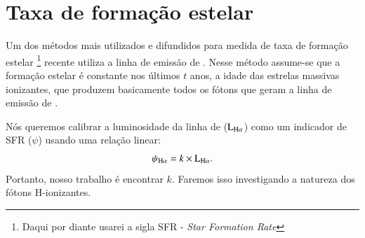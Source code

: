 \section{Taxa de formação estelar}
\label{sec:emlines:SFR}

Um dos métodos mais utilizados e difundidos para medida de taxa de formação estelar \footnote{Daqui
por diante usarei a sigla SFR - {\em Star Formation Rate}} recente utiliza a linha de emissão de
\Halpha. Nesse método assume-se que a formação estelar é constante nos últimos $t$ anos, a idade das
estrelas massivas ionizantes, que produzem basicamente todos os fótons que geram a linha de emissão
de \Halpha.

Nós queremos calibrar a luminosidade da linha de \Halpha ($\LHalpha$) como um indicador
de SFR ($\psi$) \citep[e.g., ][]{Kennicutt.1998a} usando uma relação linear:
\begin{equation}
	\psi_{\Halpha} = k \times \LHalpha.
	\label{eq:SFRHa}
\end{equation}
\noindent Portanto, nosso trabalho é encontrar $k$. Faremos isso investigando a natureza dos 
fótons H-ionizantes.

